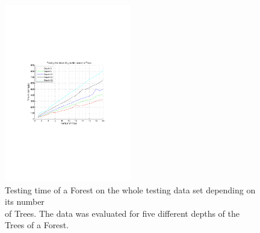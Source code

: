 \documentclass[twocolumn]{article}
\begin{document}
\begin{figure}[t] 
\centering
\includegraphics[width=0.49\textwidth]{Diagrams/Forests_Testing_Times_Gini_15_20}
\caption{Testing time of a Forest on the whole testing data set depending on its number\\\phantom{Figure 2: }of Trees. The data was evaluated for five different depths of the Trees of a Forest.}
\label{forest_testing_time}
\end{figure}
\end{document}
